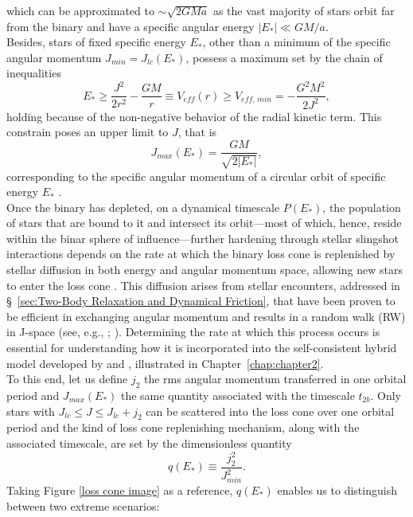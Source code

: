 \documentclass[12pt,twoside,openany]{book}
\begin{document}
which can be approximated to $\sim \sqrt{2GMa}$ as the vast majority of stars orbit far from the binary and have a specific angular energy $|E_*|\ll GM/a$.\\Besides, stars of fixed specific energy $E_*$, other than a minimum of the specific angular momentum $J_{min}=J_{lc}(E_*)$, possess a maximum set by the chain of inequalities
\begin{equation}
\label{E-J loss cone inequality}
 E_*\ge \frac{J^2}{2r^2}-\frac{GM}{r}\equiv V_{eff}(r)\ge V_{eff,\,min}=-\frac{G^2M^2}{2J^2},
\end{equation}
holding because of the non-negative behavior of the radial kinetic term. This constrain poses an upper limit to $J$, that is
\begin{equation}
 J_{max}(E_*)=\frac{GM}{\sqrt{2|E_*|}},
\end{equation}
corresponding to the specific angular momentum of a circular orbit of specific energy $E_*$ \parencite{Capozziello_2008}.\\Once the binary has depleted, on a dynamical timescale $P(E_*)$, the population of stars that are bound to it and intersect its orbit—most of which, hence, reside within the binar sphere of influence—further hardening through stellar slingshot interactions depends on the rate at which the binary loss cone is replenished by stellar diffusion in both energy and angular momentum space, allowing new stars to enter the loss cone \parencite{Lightman_1977}. This diffusion arises from stellar encounters, addressed in \S~\ref{sec:Two-Body Relaxation and Dynamical Friction},
that have been proven to be efficient in exchanging angular momentum and results in a random walk (RW) in J-space (see, e.g., \citealt{Milosavljevic_2003}; \citealt{Merritt_2013}). Determining the rate at which this process occurs is essential for understanding how it is incorporated into the self-consistent hybrid model developed by \textcite{Quinlan_1996} and \textcite{Sesana_2010}, illustrated in Chapter~\ref{chap:chapter2}.\\To this end, let us define $j_2$ the rms angular momentum transferred in one orbital period  and $J_{max}(E_*)$ the same quantity associated with the timescale $t_{2b}$. Only stars with $J_{lc}\le J\le J_{lc}+j_2$ can be scattered into the loss cone over one orbital period and the kind of loss cone replenishing mechanism, along with the associated timescale, are set by the dimensionless quantity
\begin{equation}
    q(E_*)\equiv\frac{j_2^2}{J_{min}^2}.
\end{equation}
Taking Figure \ref{loss cone image} as a reference, $q(E_*)$ enables us to distinguish between two extreme scenarios:
\end{document}
